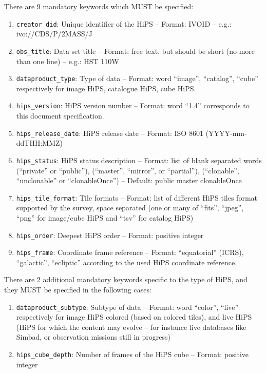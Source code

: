 \documentclass[11pt,a4paper]{ivoa}
\begin{document}
There are 9 mandatory keywords which MUST be specified:
\begin{enumerate}
\item \texttt{creator\_did}: Unique identifier of the HiPS -- Format: IVOID -- e.g.: ivo://CDS/P/2MASS/J
\item \texttt{obs\_title}: Data set title -- Format: free text, but should be short (no more than one line) -- e.g.: HST 110W
\item \texttt{dataproduct\_type}: Type of data -- Format: word ``image'', ``catalog'', ``cube'' respectively for image HiPS, catalogue HiPS, cube HiPS.
\item \texttt{hips\_version}: HiPS version number -- Format: word ``1.4'' corresponds to this document specification.
\item \texttt{hips\_release\_date}: HiPS release date -- Format: ISO 8601 (YYYY-mm-ddTHH:MMZ)
\item \texttt{hips\_status}: HiPS status description -- Format: list of blank separated words (``private'' or ``public''), (``master'', ``mirror'', or ``partial''), (``clonable'', ``unclonable'' or ``clonableOnce'') -- Default: public master clonableOnce
\item \texttt{hips\_tile\_format}: Tile formats -- Format: list of different HiPS tiles format supported by the survey, space separated (one or many of ``fits'', ``jpeg'', ``png'' for image/cube HiPS and ``tsv'' for catalog HiPS)
\item \texttt{hips\_order}: Deepest HiPS order -- Format: positive integer
\item \texttt{hips\_frame}: Coordinate frame reference -- Format: ``equatorial'' (ICRS), ``galactic'', ``ecliptic'' according to the used HiPS coordinate reference.
\end{enumerate}

There are 2 additional mandatory keywords specific to the type of HiPS, and they MUST be specified in the following cases:
\begin{enumerate}
\item \texttt{dataproduct\_subtype}: Subtype of data -- Format: word ``color'', ``live'' respectively for image HiPS colored (based on colored tiles), and live HiPS (HiPS for which the content may evolve -- for instance live databases like Simbad, or observation missions still in progress)
\item \texttt{hips\_cube\_depth}: Number of frames of the HiPS cube -- Format: positive integer
\end{enumerate}
\end{document}
